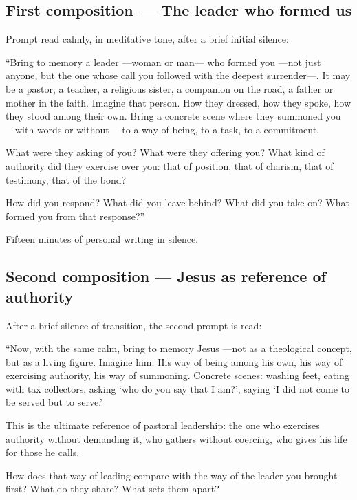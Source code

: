 \documentclass[11pt, a4paper]{article}
\begin{document}
\begin{actividad}
\subsection*{First composition --- The leader who formed us}

Prompt read calmly, in meditative tone, after a brief initial silence:

\begin{meditacion}
``Bring to memory a leader ---woman or man--- who formed you ---not just anyone, but the one whose call you followed with the deepest surrender---. It may be a pastor, a teacher, a religious sister, a companion on the road, a father or mother in the faith. Imagine that person. How they dressed, how they spoke, how they stood among their own. Bring a concrete scene where they summoned you ---with words or without--- to a way of being, to a task, to a commitment.

What were they asking of you? What were they offering you? What kind of authority did they exercise over you: that of position, that of charism, that of testimony, that of the bond?

How did you respond? What did you leave behind? What did you take on? What formed you from that response?''
\end{meditacion}

Fifteen minutes of personal writing in silence.

\subsection*{Second composition --- Jesus as reference of authority}

After a brief silence of transition, the second prompt is read:

\begin{meditacion}
``Now, with the same calm, bring to memory Jesus ---not as a theological concept, but as a living figure. Imagine him. His way of being among his own, his way of exercising authority, his way of summoning. Concrete scenes: washing feet, eating with tax collectors, asking `who do you say that I am?', saying `I did not come to be served but to serve.'

This is the ultimate reference of pastoral leadership: the one who exercises authority without demanding it, who gathers without coercing, who gives his life for those he calls.

How does that way of leading compare with the way of the leader you brought first? What do they share? What sets them apart?


\end{meditacion}
\end{actividad}
\end{document}
